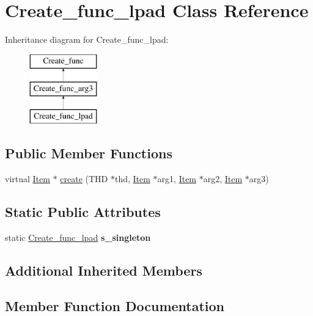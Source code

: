 \hypertarget{classCreate__func__lpad}{}\section{Create\+\_\+func\+\_\+lpad Class Reference}
\label{classCreate__func__lpad}
Inheritance diagram for Create\+\_\+func\+\_\+lpad\+:\begin{figure}[H]
\begin{center}
\leavevmode
\includegraphics[height=3.000000cm]{classCreate__func__lpad}
\end{center}
\end{figure}
\subsection*{Public Member Functions}
\begin{DoxyCompactItemize}
\item 
virtual \mbox{\hyperlink{classItem}{Item}} $\ast$ \mbox{\hyperlink{classCreate__func__lpad_a2dc0840d72c7225074a83a6883b87e78}{create}} (T\+HD $\ast$thd, \mbox{\hyperlink{classItem}{Item}} $\ast$arg1, \mbox{\hyperlink{classItem}{Item}} $\ast$arg2, \mbox{\hyperlink{classItem}{Item}} $\ast$arg3)
\end{DoxyCompactItemize}
\subsection*{Static Public Attributes}
\begin{DoxyCompactItemize}
\item 
\mbox{\label{classCreate__func__lpad_ace962f59af476a45a14cc7b4e7863f82}} 
static \mbox{\hyperlink{classCreate__func__lpad}{Create\+\_\+func\+\_\+lpad}} {\bfseries s\+\_\+singleton}
\end{DoxyCompactItemize}
\subsection*{Additional Inherited Members}


\subsection{Member Function Documentation}
\mbox{\label{classCreate__func__lpad_a2dc0840d72c7225074a83a6883b87e78}} 
